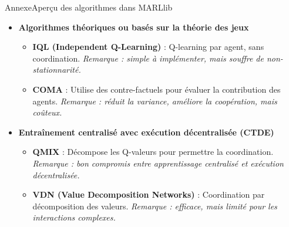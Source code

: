 \begin{frame}[allowframebreaks]{Annexe}{Aperçu des algorithmes dans MARLlib}
\begin{itemize}
        \item \textbf{Algorithmes théoriques ou basés sur la théorie des jeux}
              \begin{itemize}
                  \item \textbf{IQL (Independent Q-Learning)} : Q-learning par agent, sans coordination.\newline
                        \textit{Remarque : simple à implémenter, mais souffre de non-stationnarité.}
                  \item \textbf{COMA} : Utilise des contre-factuels pour évaluer la contribution des agents.\newline
                        \textit{Remarque : réduit la variance, améliore la coopération, mais coûteux.}
              \end{itemize}

        \item \textbf{Entraînement centralisé avec exécution décentralisée (CTDE)}
              \begin{itemize}
                  \item \textbf{QMIX} : Décompose les Q-valeurs pour permettre la coordination.\newline
                        \textit{Remarque : bon compromis entre apprentissage centralisé et exécution décentralisée.}
                  \item \textbf{VDN (Value Decomposition Networks)} : Coordination par décomposition des valeurs.\newline
                        \textit{Remarque : efficace, mais limité pour les interactions complexes.}
              \end{itemize}
    \end{itemize}

\end{frame}
